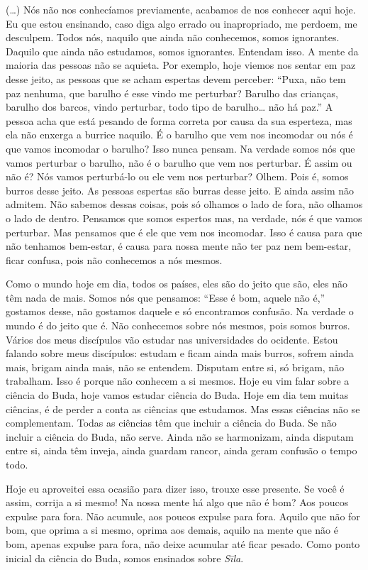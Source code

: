 (…) Nós não nos conhecíamos previamente, acabamos de nos conhecer
aqui hoje. Eu que estou ensinando, caso diga algo errado ou
inapropriado, me perdoem, me desculpem. Todos nós, naquilo que ainda
não conhecemos, somos ignorantes. Daquilo que ainda não estudamos,
somos ignorantes. Entendam isso. A mente da maioria das pessoas não se
aquieta. Por exemplo, hoje viemos nos sentar em paz desse jeito, as
pessoas que se acham espertas devem perceber: “Puxa, não tem paz
nenhuma, que barulho é esse vindo me perturbar? Barulho das crianças,
barulho dos barcos, vindo perturbar, todo tipo de barulho… não há paz.”
A pessoa acha que está pesando de forma correta por causa da sua
esperteza, mas ela não enxerga a burrice naquilo. É o barulho que vem
nos incomodar ou nós é que vamos incomodar o barulho? Isso nunca
pensam. Na verdade somos nós que vamos perturbar o barulho, não é o
barulho que vem nos perturbar. É assim ou não é? Nós vamos perturbá-lo
ou ele vem nos perturbar? Olhem. Pois é, somos burros desse jeito. As
pessoas espertas são burras desse jeito. E ainda assim não admitem. Não
sabemos dessas coisas, pois só olhamos o lado de fora, não olhamos o
lado de dentro. Pensamos que somos espertos mas, na verdade, nós é que
vamos perturbar. Mas pensamos que é ele que vem nos incomodar. Isso é
causa para que não tenhamos bem-estar, é causa para nossa mente não ter
paz nem bem-estar, ficar confusa, pois não conhecemos a nós mesmos.

Como o mundo hoje em dia, todos os países, eles são do jeito que
são, eles não têm nada de mais. Somos nós que pensamos: “Esse é bom,
aquele não é,” gostamos desse, não gostamos daquele e só encontramos
confusão. Na verdade o mundo é do jeito que é. Não conhecemos sobre nós
mesmos, pois somos burros. Vários dos meus discípulos vão estudar nas
universidades do ocidente. Estou falando sobre meus discípulos: estudam
e ficam ainda mais burros, sofrem ainda mais, brigam ainda mais, não se
entendem. Disputam entre si, só brigam, não trabalham. Isso é porque
não conhecem a si mesmos. Hoje eu vim falar sobre a ciência do Buda,
hoje vamos estudar ciência do Buda. Hoje em dia tem muitas ciências, é
de perder a conta as ciências que estudamos. Mas essas ciências não se
complementam. Todas as ciências têm que incluir a ciência do Buda. Se
não incluir a ciência do Buda, não serve. Ainda não se harmonizam,
ainda disputam entre si, ainda têm inveja, ainda guardam rancor, ainda
geram confusão o tempo todo.

Hoje eu aproveitei essa ocasião para dizer isso, trouxe esse
presente. Se você é assim, corrija a si mesmo! Na nossa mente há algo
que não é bom? Aos poucos expulse para fora. Não acumule, aos poucos
expulse para fora. Aquilo que não for bom, que oprima a si mesmo,
oprima aos demais, aquilo na mente que não é bom, apenas expulse para
fora, não deixe acumular até ficar pesado. Como ponto inicial da
ciência do Buda, somos ensinados sobre \textit{Sīla}. 


